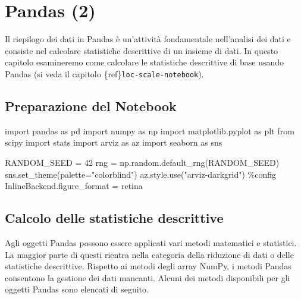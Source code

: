 \documentclass[
  letterpaper,
  krantz2]{{[}./krantz{]}}
\newenvironment{Shaded}{\begin{snugshade}}{\end{snugshade}}
\newcommand{\DecValTok}[1]{\textcolor[rgb]{0.68,0.00,0.00}{#1}}
\newcommand{\ImportTok}[1]{\textcolor[rgb]{0.00,0.46,0.62}{#1}}
\newcommand{\NormalTok}[1]{\textcolor[rgb]{0.00,0.23,0.31}{#1}}
\newcommand{\OperatorTok}[1]{\textcolor[rgb]{0.37,0.37,0.37}{#1}}
\newcommand{\StringTok}[1]{\textcolor[rgb]{0.13,0.47,0.30}{#1}}
\begin{document}
\chapter{Pandas (2)}\label{sec-pandas-2}

Il riepilogo dei dati in Pandas è un'attività fondamentale nell'analisi
dei dati e consiste nel calcolare statistiche descrittive di un insieme
di dati. In questo capitolo esamineremo come calcolare le statistiche
descrittive di base usando Pandas (si veda il capitolo
\{ref\}\texttt{loc-scale-notebook}).

\section{Preparazione del Notebook}\label{preparazione-del-notebook-1}

\begin{Shaded}
\begin{Highlighting}[]
\ImportTok{import}\NormalTok{ pandas }\ImportTok{as}\NormalTok{ pd}
\ImportTok{import}\NormalTok{ numpy }\ImportTok{as}\NormalTok{ np}
\ImportTok{import}\NormalTok{ matplotlib.pyplot }\ImportTok{as}\NormalTok{ plt}
\ImportTok{from}\NormalTok{ scipy }\ImportTok{import}\NormalTok{ stats}
\ImportTok{import}\NormalTok{ arviz }\ImportTok{as}\NormalTok{ az}
\ImportTok{import}\NormalTok{ seaborn }\ImportTok{as}\NormalTok{ sns}
\end{Highlighting}
\end{Shaded}

\begin{Shaded}
\begin{Highlighting}[]
\NormalTok{RANDOM\_SEED }\OperatorTok{=} \DecValTok{42}
\NormalTok{rng }\OperatorTok{=}\NormalTok{ np.random.default\_rng(RANDOM\_SEED)}
\NormalTok{sns.set\_theme(palette}\OperatorTok{=}\StringTok{"colorblind"}\NormalTok{)}
\NormalTok{az.style.use(}\StringTok{"arviz{-}darkgrid"}\NormalTok{)}
\OperatorTok{\%}\NormalTok{config InlineBackend.figure\_format }\OperatorTok{=} \StringTok{\textquotesingle{}retina\textquotesingle{}}
\end{Highlighting}
\end{Shaded}

\section{Calcolo delle statistiche
descrittive}\label{calcolo-delle-statistiche-descrittive}

Agli oggetti Pandas possono essere applicati vari metodi matematici e
statistici. La maggior parte di questi rientra nella categoria della
riduzione di dati o delle statistiche descrittive. Rispetto ai metodi
degli array NumPy, i metodi Pandas consentono la gestione dei dati
mancanti. Alcuni dei metodi disponibili per gli oggetti Pandas sono
elencati di seguito.
\end{document}
